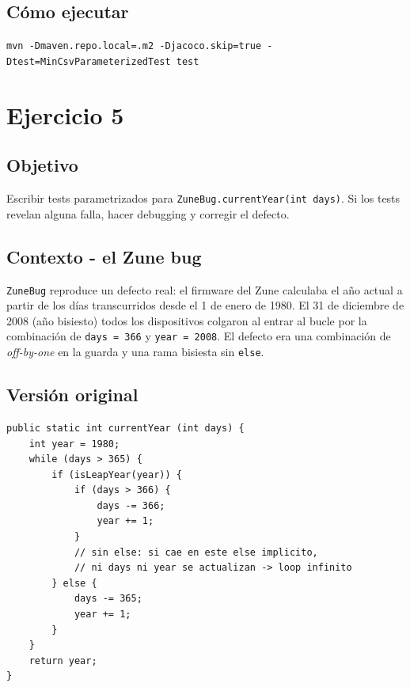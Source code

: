 \documentclass[12pt,a4paper]{article}
\begin{document}
\subsection{Cómo ejecutar}
\begin{center}
\texttt{mvn -Dmaven.repo.local=.m2 -Djacoco.skip=true -Dtest=MinCsvParameterizedTest test}
\end{center}

\section{Ejercicio 5}
\subsection{Objetivo}
Escribir tests parametrizados para \texttt{ZuneBug.currentYear(int days)}. Si los tests revelan alguna falla, hacer debugging y corregir el defecto.

\subsection{Contexto - el Zune bug}
\texttt{ZuneBug} reproduce un defecto real: el firmware del Zune calculaba el año actual a partir de los días transcurridos desde el 1 de enero de 1980. El 31 de diciembre de 2008 (año bisiesto) todos los dispositivos colgaron al entrar al bucle por la combinación de \texttt{days = 366} y \texttt{year = 2008}. El defecto era una combinación de \textit{off-by-one} en la guarda y una rama bisiesta sin \texttt{else}.

\subsection{Versión original}
\begin{lstlisting}[style=javastyle]
public static int currentYear (int days) {
    int year = 1980;
    while (days > 365) {
        if (isLeapYear(year)) {
            if (days > 366) {
                days -= 366;
                year += 1;
            }
            // sin else: si cae en este else implicito,
            // ni days ni year se actualizan -> loop infinito
        } else {
            days -= 365;
            year += 1;
        }
    }
    return year;
}
\end{lstlisting}
\end{document}
